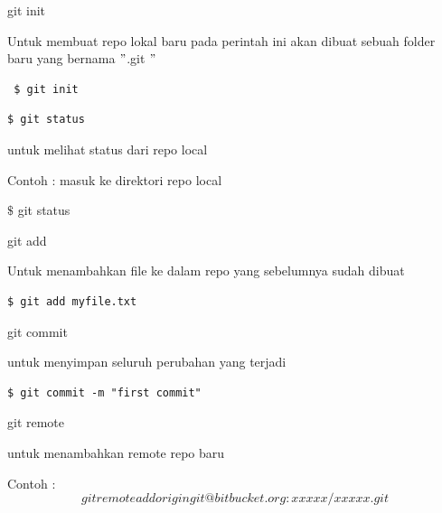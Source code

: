 \noindent 
git init $  $ \par
\noindent 
\vspace{\baselineskip}
Untuk membuat repo lokal baru pada perintah ini akan dibuat sebuah folder baru yang bernama  $ " $.git $ " $ \par
\noindent 
\vspace{\baselineskip}
\begin{verbatim}
 $ git init
\end{verbatim}
\begin{verbatim}
$ git status
\end{verbatim}
\vspace{\baselineskip}
untuk melihat status dari repo local \par
\noindent 
\vspace{\baselineskip}
Contoh : masuk ke direktori repo local \par
\noindent 
\vspace{\baselineskip}
 $  \$  $ git status \par
\vspace{12pt}
\noindent 
git add $  $ \par
\noindent 
\vspace{\baselineskip}
Untuk menambahkan file ke dalam repo yang sebelumnya sudah dibuat \par
\noindent 
\vspace{\baselineskip}
\begin{verbatim}
$ git add myfile.txt
\end{verbatim}
\vspace{12pt}
\noindent 
git commit \par
\noindent 
\vspace{\baselineskip}
untuk menyimpan seluruh perubahan yang terjadi \par
\noindent 
\vspace{\baselineskip}
\begin{verbatim}
$ git commit -m "first commit"
\end{verbatim}\vspace{12pt}
\noindent 
git remote $  $ \par
\noindent 
\vspace{\baselineskip}
untuk menambahkan remote repo baru \par
\noindent 
\vspace{\baselineskip}
Contoh :
 \begin{equation}
 git remote add origin git@bitbucket.org:xxxxx/xxxxx.git
 \end{equation}

